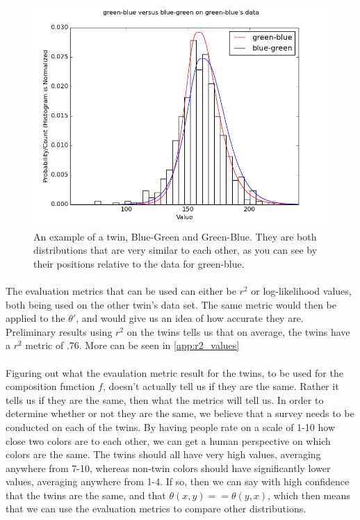 \documentclass[12pt, letterpaper]{article}
\begin{document}
\begin{figure}[h]
\begin{center}
\includegraphics[width=.75\textwidth]{green-blue}
\end{center}
\caption{An example of a twin, Blue-Green and Green-Blue. They are both distributions that are very similar to each other, as you can see by their positions relative to the data for green-blue.}
\label{fig:twin_blue_green}
\end{figure}

\paragraph{} The evaluation metrics that can be used can either be $r^2$ or log-likelihood values, both being used on the other twin's data set. The same metric would then be applied to the $\theta'$, and would give us an idea of how accurate they are. Preliminary results using $r^2$ on the twins tells us that on average, the twins have a $r^2$ metric of .76. More can be seen in \autoref{app:r2_values}

\paragraph{} Figuring out what the evaulation metric result for the twins, to be used for the composition function $f$, doesn't actually tell us if they are the same. Rather it tells us if they are the same, then what the metrics will tell us. In order to determine whether or not they are the same, we believe that a survey needs to be conducted on each of the twins. By having people rate on a scale of 1-10 how close two colors are to each other, we can get a human perspective on which colors are the same. The twins should all have very high values, averaging anywhere from 7-10, whereas non-twin colors should have significantly lower values, averaging anywhere from 1-4. If so, then we can say with high confidence that the twins are the same, and that $\theta(x,y) == \theta(y, x)$, which then means that we can use the evaluation metrics to compare other distributions.
\end{document}
